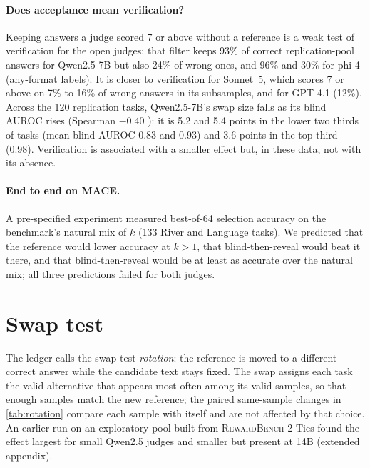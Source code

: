 \paragraph{Does acceptance mean verification?}
Keeping answers a judge scored 7 or above without a reference is a weak test of verification for the open judges: that filter keeps 93\% of correct replication-pool answers for Qwen2.5-7B but also 24\% of wrong ones, and 96\% and 30\% for phi-4 (any-format labels). It is closer to verification for Sonnet~5, which scores 7 or above on 7\% to 16\% of wrong answers in its subsamples, and for GPT-4.1 (12\%). Across the 120 replication tasks, Qwen2.5-7B's swap size falls as its blind AUROC rises (Spearman $-0.40$ ): it is 5.2 and 5.4 points in the lower two thirds of tasks (mean blind AUROC 0.83 and 0.93) and 3.6 points in the top third (0.98). Verification is associated with a smaller effect but, in these data, not with its absence.\ph

\paragraph{End to end on \textsc{MACE}.}
A pre-specified experiment measured best-of-64 selection accuracy on the benchmark's natural mix of $k$ (133 River and Language tasks). We predicted that the reference would lower accuracy at $k{>}1$, that blind-then-reveal would beat it there, and that blind-then-reveal would be at least as accurate over the natural mix; all three predictions failed for both judges.

\FloatBarrier
\section{Swap test}
\label{app:rotation}

The ledger calls the swap test \emph{rot\-ation}: the reference is moved to a different correct answer while the candidate text stays fixed. The swap assigns each task the valid alternative that appears most often among its valid samples, so that enough samples match the new reference; the paired same-sample changes in \cref{tab:rotation} compare each sample with itself and are not affected by that choice. An earlier run on an exploratory pool built from \textsc{RewardBench-2} Ties found the effect largest for small Qwen2.5 judges and smaller but present at 14B (extended appendix).


